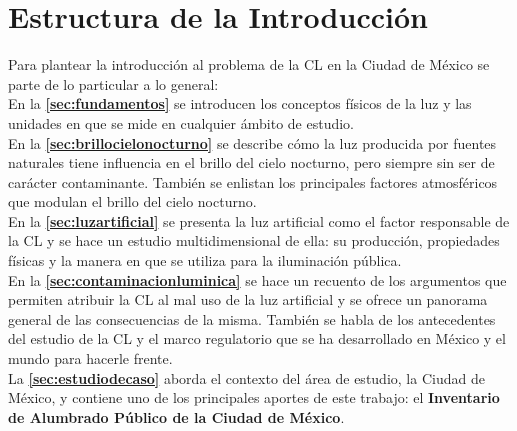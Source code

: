 \chapter*{Estructura de la Introducción}

Para plantear la introducción al problema de la CL en la Ciudad de México se parte de lo particular a lo general:\\

En la \textbf{\autoref{sec:fundamentos}} se introducen los conceptos físicos de la luz y las unidades en que se mide en cualquier ámbito de estudio.\\

En la \textbf{\autoref{sec:brillocielonocturno}} se describe cómo la luz producida por fuentes naturales tiene influencia en el brillo del cielo nocturno, pero siempre sin ser de carácter contaminante. También se enlistan los principales factores atmosféricos que modulan el brillo del cielo nocturno.\\

En la \textbf{\autoref{sec:luzartificial}} se presenta la luz artificial como el factor responsable de la CL y se hace un estudio multidimensional de ella: su producción, propiedades físicas y la manera en que se utiliza para la iluminación pública.\\

En la \textbf{\autoref{sec:contaminacionluminica}} se hace un recuento de los argumentos que permiten atribuir la CL al mal uso de la luz artificial y se ofrece un panorama general de las consecuencias de la misma. También se habla de los antecedentes del estudio de la CL y el marco regulatorio que se ha desarrollado en México y el mundo para hacerle frente.\\

La \textbf{\autoref{sec:estudiodecaso}} aborda el contexto del área de estudio, la Ciudad de México, y contiene uno de los principales aportes de este trabajo: el \textbf{Inventario de Alumbrado Público de la Ciudad de México}.
